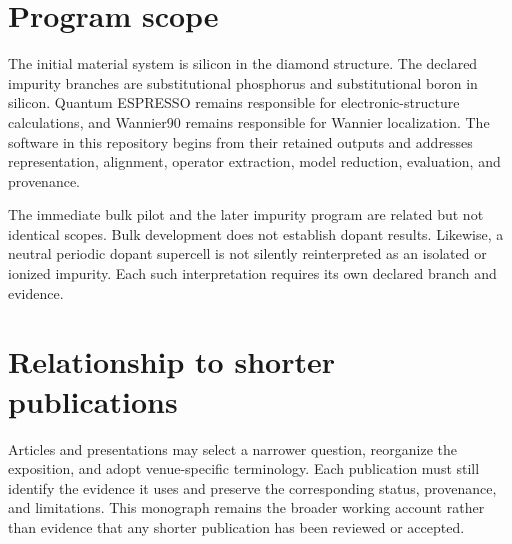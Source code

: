 \section*{Program scope}

The initial material system is silicon in the diamond structure. The declared
impurity branches are substitutional phosphorus and substitutional boron in
silicon. Quantum ESPRESSO remains responsible for electronic-structure
calculations, and Wannier90 remains responsible for Wannier localization. The
software in this repository begins from their retained outputs and addresses
representation, alignment, operator extraction, model reduction, evaluation,
and provenance.

The immediate bulk pilot and the later impurity program are related but not
identical scopes. Bulk development does not establish dopant results. Likewise,
a neutral periodic dopant supercell is not silently reinterpreted as an isolated
or ionized impurity. Each such interpretation requires its own declared branch
and evidence.


\section*{Relationship to shorter publications}

Articles and presentations may select a narrower question, reorganize the
exposition, and adopt venue-specific terminology. Each publication must still
identify the evidence it uses and preserve the corresponding status,
provenance, and limitations. This monograph remains the broader working account
rather than evidence that any shorter publication has been reviewed or
accepted.
